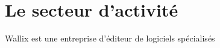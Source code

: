 \documentclass[a4paper, 11pt, french]{report}
\begin{document}
                                                                                                                                                                                                                             \section{Le
                                                                                                                                                                                                                             secteur
                                                                                                                                                                                                                             d'activité}
                                                                                                                                                                                                                                 Wallix
                                                                                                                                                                                                                                 est
                                                                                                                                                                                                                                 une
                                                                                                                                                                                                                                 entreprise
                                                                                                                                                                                                                                 d'éditeur
                                                                                                                                                                                                                                 de
                                                                                                                                                                                                                                 logiciels
                                                                                                                                                                                                                                 spécialisés
\end{document}

